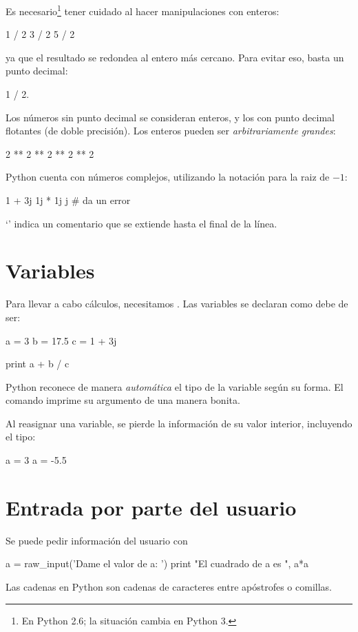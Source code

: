 Es necesario\footnote{En Python 2.6; la situación cambia en Python 3.} tener cuidado al hacer manipulaciones con enteros:
\begin{python}
1 / 2
3 / 2
5 / 2
\end{python}
ya que el resultado se redondea al entero más cercano. Para evitar eso, basta un punto decimal:
\begin{python}
1 / 2.
\end{python}


Los números sin punto decimal se consideran enteros, y los con punto decimal flotantes (de doble precisión).
Los enteros pueden ser \emph{arbitrariamente grandes}:
\begin{python}
2 ** 2 ** 2 ** 2 ** 2
\end{python}



Python cuenta con números complejos, utilizando la notación  para la raiz de $-1$:
\begin{python}
1 + 3j
1j * 1j
j    # da un error
\end{python}
`\inl{#}' indica un comentario que se extiende hasta el final de la línea.



\section{Variables}
Para llevar a cabo cálculos, necesitamos . Las variables se declaran como debe de ser:
\begin{python}
a = 3
b = 17.5
c = 1 + 3j

print a + b / c
\end{python}
Python reconece de manera \emph{automática} el tipo de la variable según su forma.
El comando  imprime su argumento de una manera bonita.

Al reasignar una variable, se pierde la información de su valor interior, incluyendo el tipo:
\begin{python}
a = 3
a = -5.5
\end{python}


\section{Entrada por parte del usuario}
Se puede pedir información del usuario con
\begin{python}
a = raw_input('Dame el valor de a: ')
print "El cuadrado de a es ", a*a
\end{python}
Las cadenas en Python son cadenas de caracteres entre apóstrofes o comillas. 







